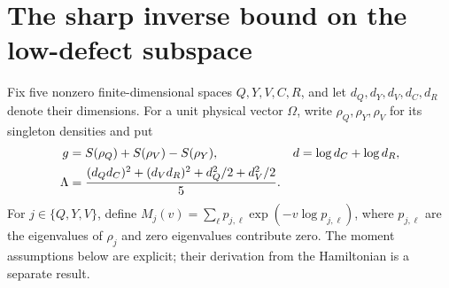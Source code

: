 \section{The sharp inverse bound on the low-defect subspace}

Fix five nonzero finite-dimensional spaces $Q,Y,V,C,R$, and let
$d_Q,d_Y,d_V,d_C,d_R$ denote their dimensions. For a unit physical
vector $\Omega$, write $\rho_Q,\rho_Y,\rho_V$ for its singleton
densities and put
\begin{align}
 g&=S(\rho_Q)+S(\rho_V)-S(\rho_Y),&
 d&=\log d_C+\log d_R,\notag\\
 \Lambda&=\frac{(d_Qd_C)^2+(d_Vd_R)^2+d_Q^2/2+d_V^2/2}{5}.
\end{align}
For $j\in\{Q,Y,V\}$, define
$M_j(v)=\sum_\ell p_{j,\ell}\exp(-v\log p_{j,\ell})$,
where $p_{j,\ell}$ are the eigenvalues of $\rho_j$ and zero
eigenvalues contribute zero. The moment assumptions below are explicit;
their derivation from the Hamiltonian is a separate result.

